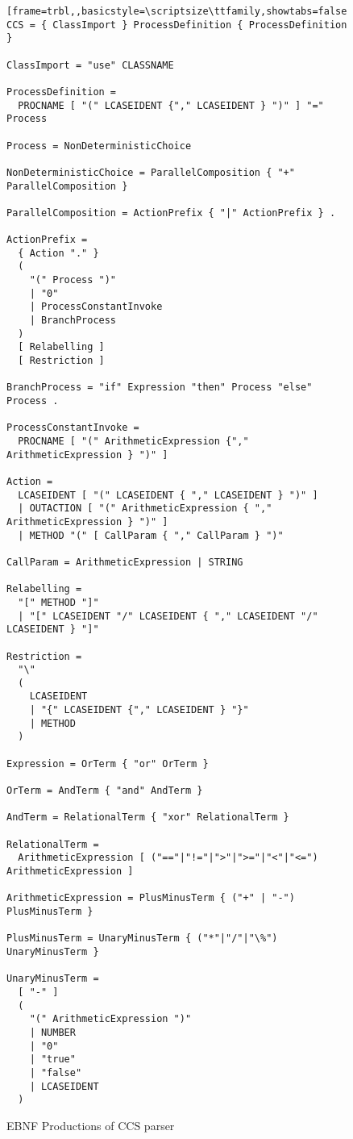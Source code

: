 	\begin{figure}
	\label{fig:ccs_ebnf}
	\caption{EBNF Productions of CCS parser}
\lstset{showtabs=false,showspaces=false,showstringspaces=false}
\begin{lstlisting}[frame=trbl,,basicstyle=\scriptsize\ttfamily,showtabs=false,showspaces=false]
CCS = { ClassImport } ProcessDefinition { ProcessDefinition } 

ClassImport = "use" CLASSNAME 

ProcessDefinition = 
  PROCNAME [ "(" LCASEIDENT {"," LCASEIDENT } ")" ] "=" Process 

Process = NonDeterministicChoice

NonDeterministicChoice = ParallelComposition { "+" ParallelComposition }

ParallelComposition = ActionPrefix { "|" ActionPrefix } .

ActionPrefix =
  { Action "." }
  (
    "(" Process ")"
    | "0"
    | ProcessConstantInvoke
    | BranchProcess
  )
  [ Relabelling ]
  [ Restriction ]

BranchProcess = "if" Expression "then" Process "else" Process .

ProcessConstantInvoke = 
  PROCNAME [ "(" ArithmeticExpression {"," ArithmeticExpression } ")" ]

Action =
  LCASEIDENT [ "(" LCASEIDENT { "," LCASEIDENT } ")" ]
  | OUTACTION [ "(" ArithmeticExpression { "," ArithmeticExpression } ")" ]
  | METHOD "(" [ CallParam { "," CallParam } ")"

CallParam = ArithmeticExpression | STRING

Relabelling =
  "[" METHOD "]"
  | "[" LCASEIDENT "/" LCASEIDENT { "," LCASEIDENT "/" LCASEIDENT } "]"

Restriction = 
  "\" 
  (
    LCASEIDENT 
    | "{" LCASEIDENT {"," LCASEIDENT } "}"
    | METHOD
  )        

Expression = OrTerm { "or" OrTerm }

OrTerm = AndTerm { "and" AndTerm }

AndTerm = RelationalTerm { "xor" RelationalTerm }

RelationalTerm = 
  ArithmeticExpression [ ("=="|"!="|">"|">="|"<"|"<=") ArithmeticExpression ]
		
ArithmeticExpression = PlusMinusTerm { ("+" | "-") PlusMinusTerm }

PlusMinusTerm = UnaryMinusTerm { ("*"|"/"|"\%") UnaryMinusTerm }

UnaryMinusTerm =
  [ "-" ]                                   
  (
    "(" ArithmeticExpression ")"
    | NUMBER 
    | "0"
    | "true"
    | "false"
    | LCASEIDENT
  )
	\end{lstlisting}
	\end{figure}
	
